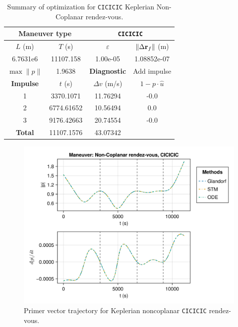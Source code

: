 \begin{table}[htpb]
    \centering
    \begin{tabular}{cccc} \toprule
    \multicolumn{2}{c}{\textbf{Maneuver type}} & \multicolumn{2}{c}{\texttt{CICICIC}} \\ \midrule
    \(L\) (m) & \(T\) (s) & \(\varepsilon\) & \(\lVert \Delta \mathbf{r}_{f} \rVert\) (m)    \\ \midrule
    6.7631e6          & 11107.158          & 1.00e-05                & 1.08852e-07                        \\ \midrule
    \(\max \lVert p \rVert\) & 1.9638     & \textbf{Diagnostic}   & Add impulse        \\ \midrule
    \textbf{Impulse} & \(t\) (s) & \(\Delta v\) (m/s) & \(1 - p \cdot \hat{u}\) \\ \midrule
    1                 & 3370.1071          & 11.76294             & -0.0                    \\
    2                 & 6774.61652          & 10.56494             & 0.0                    \\
    3                 & 9176.42663          & 20.74554             & -0.0                    \\\midrule
    \textbf{Total}   & 11107.1576          & 43.07342             &                     \\ \bottomrule   
    \end{tabular}
    \caption{Summary of optimization for \texttt{CICICIC} Keplerian Non-Coplanar rendez-vous.}
    \label{tab:tb_nr_CICICIC_tab}
\end{table}

\begin{figure}[htbp]
    \centering
    \includegraphics[width=0.8\linewidth]{../results/two_body/ipv_noncop/CICICIC_primer_vector.png}
    \caption{Primer vector trajectory for Keplerian noncoplanar \texttt{CICICIC} rendez-vous.}
    \label{fig:tb_ncop_CICICIC_pv}
\end{figure}

